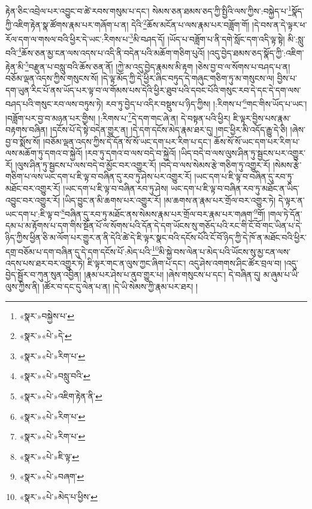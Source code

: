 རྟེན་ཅིང་འབྲེལ་པར་འབྱུང་བ་ཚེ་རབས་གསུམ་པ་དང་། སེམས་ཅན་ཐམས་ཅད་ཀྱི་སྤྱིའི་ལས་ཀྱིས་:བསྐྱེད་པ་\footnote{«སྣར་»བསྐྱེས་པ་}སྣོད་ཀྱི་འཇིག་རྟེན་སྣ་ཚོགས་རྣམ་པར་གཞོག་པ་ན། དེའི་\footnote{«སྣར་»«པེ་»དེ་}ཆོས་མངོན་པ་ལས་རྣམ་པར་བཟློག་གོ། །དེ་བས་ན་དེ་ལྟར་ཕ་རོལ་དག་ལ་གསལ་བའི་ཕྱིར་དེ་ཡང་:རིགས་པ་\footnote{«སྣར་»«པེ་»རིག་པ་}མི་བཤད་དོ། །ཡོད་པ་བཟློག་པ་ནི་དགེ་སློང་དག་འདི་ལྟ་སྟེ། མི་:སླུ་བའི་\footnote{«སྣར་»«པེ་»བསླུ་བའི་}ཆོས་ཅན་མྱ་ངན་ལས་འདས་པ་འདི་ནི་བདེན་པའི་མཆོག་གཅིག་པུའོ། །འདུ་བྱེད་ཐམས་ཅད་སྣོད་ཀྱི་:འཇིག་རྟེན་མི་\footnote{«སྣར་»«པེ་»འཇིག་རྟེན་ནི་}བརྫུན་པ་བསླུ་བའི་ཆོས་ཅན་ནོ། །ཀྱེ་མ་འདུ་བྱེད་རྣམས་མི་རྟག །ཅེས་བྱ་བ་ལ་སོགས་པ་བཤད་པ་ན། བཅོམ་ལྡན་འདས་ཀྱིས་གསུངས་སོ། །དེ་ལྟ་མོད་ཀྱི་དེ་ཕྱིར་ཞིང་བཏུད་དེ་གཞུང་གཅིག་ཏུ་མ་གསུངས་ལ། བྱིས་པ་དག་ཡུན་རིང་པོ་ནས་ཡོད་པར་ལྟ་བ་ལ་གོམས་པས་དེའི་ཕྱིར་ཐུབ་པའི་དབང་པོའི་གསུང་རབ་དེ་དང་དེ་དག་ལས་བཤད་པའི་གསུང་རབ་ལས་བཏུས་ཏེ། རབ་ཏུ་བྱེད་པ་འདིར་བསྡུས་པ་ཉིད་ཀྱིས། །:རིགས་པ་\footnote{«སྣར་»«པེ་»རིག་པ་}གང་གིས་ཡོད་པ་ཡང་། །བཟློག་པར་བྱ་བ་མཉན་པར་གྱིས། །:རིགས་པ་\footnote{«སྣར་»«པེ་»རིག་པ་}དེ་དག་གང་ཞེ་ན། དེ་བསྟན་པའི་ཕྱིར། ཇི་ལྟར་བྱིས་པས་རྣམ་བརྟགས་བཞིན། །དངོས་པོ་དེ་སྟེ་བདེན་གྱུར་ན། །དེ་དག་དངོས་མེད་རྣམ་ཐར་དུ། །གང་ཕྱིར་མི་འདོད་རྒྱུ་དེ་ཅི། །ཞེས་བྱ་བ་སྨོས་སོ། །བཅོམ་ལྡན་འདས་ཀྱིས་དེ་དོན་སོ་སོ་ཡང་དག་པར་རིག་པ་དང་། ཆོས་སོ་སོ་ཡང་དག་པར་རིག་པ་ལས་མཆོག་ཏུ་དགའ་བ་སྐྱེའོ། །རབ་ཏུ་དགའ་བ་ལས་བདེ་བ་སྐྱེའོ། །ཡིད་བདེ་བ་ལས་ལུས་ཤིན་ཏུ་སྦྱངས་པར་འགྱུར་རོ། །ལུས་ཤིན་ཏུ་སྦྱངས་པ་ལས་བདེ་བ་མྱོང་བར་འགྱུར་རོ། །བདེ་བ་ལས་སེམས་རྩེ་གཅིག་ཏུ་འགྱུར་རོ། །སེམས་རྩེ་གཅིག་པ་ལས་ཡང་དག་པ་ཇི་ལྟ་བ་བཞིན་དུ་རབ་ཏུ་ཤེས་པར་འགྱུར་རོ། །ཡང་དག་པ་ཇི་ལྟ་བ་བཞིན་དུ་རབ་ཏུ་མཐོང་བར་འགྱུར་རོ། །ཡང་དག་པ་ཇི་ལྟ་བ་བཞིན་རབ་ཏུ་ཤེས། ཡང་དག་པ་ཇི་ལྟ་བ་བཞིན་རབ་ཏུ་མཐོང་ན་ཡིད་འབྱུང་བར་འགྱུར་རོ། །ཡིད་བྱུང་ན་མི་ཆགས་པར་འགྱུར་རོ། །མ་ཆགས་ན་རྣམ་པར་གྲོལ་བར་འགྱུར་ཏེ། དེ་ལྟར་ན་ཡང་དག་པ་:ཇི་ལྟ་བ་\footnote{«སྣར་»«པེ་»ཇི་ལྟ་}བཞིན་དུ་རབ་ཏུ་མཐོང་ནས་སེམས་རྣམ་པར་གྲོལ་བར་རྣམ་པར་གཞག་\footnote{«སྣར་»«པེ་»བཞག་}གོ། །གལ་ཏེ་དོན་དམ་པ་མ་རྟོགས་པ་དག་གིས་སྔོན་པོ་ལ་སོགས་པའི་དོན་དེ་དག་ཡོངས་སུ་གཅོད་པའི་རང་གི་ངོ་བོ་གང་ཡིན་པ་དེ་ཉིད་ཀྱིས་ཕྱིན་ཅི་མ་ལོག་པར་གྱུར་ན་ནི་དེའི་ཚེ་དེ་ཇི་ལྟར་སྣང་བའི་དངོས་པོའི་ངོ་བོ་ཉིད་ཀྱི་དེ་ཁོ་ན་མཐོང་བའི་ཕྱིར་དགྲ་བཅོམ་པ་དག་བཞིན་དུ་དེ་དག་དངོས་པོ་:མེད་པའི་\footnote{«སྣར་»«པེ་»མེད་པ་ཕྱིས་}མི་སྐྱེ་བས་ལེན་པ་མེད་པའི་ཡོངས་སུ་མྱ་ངན་ལས་འདས་པས་ཐར་བར་འགྱུར་ཏེ། ཇི་ལྟར་གང་ན་ལུས་ཀྱང་ཞིག་པ་དང་། འདུ་ཤེས་འགགས་ཤིང་ཚོར་བྲལ་བ། །འདུ་བྱེད་སྦྱོར་བ་ཀུན་སུན་འབྱིན། །རྣམ་པར་ཤེས་པ་ནུབ་གྱུར་པ། །ཞེས་གསུངས་པ་དང་། དེ་བཞིན་དུ། མ་ཞུམ་པ་ཡི་ལུས་ཀྱིས་ནི། །ཚོར་བ་དང་དུ་ལེན་པ་ན། །དེ་ཡི་སེམས་ཀྱི་རྣམ་པར་ཐར། །
